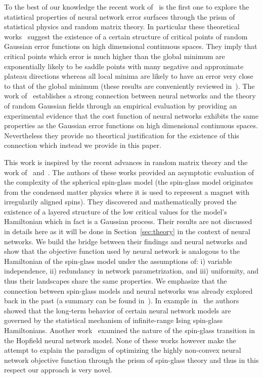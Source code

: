\documentclass[twoside]{article}
\begin{document}
To the best of our knowledge the recent work of~\cite{DBLP:journals/corr/DauphinPGCGB14} is the first one to explore the statistical properties of neural network error surfaces through the prism of statistical physics and random matrix theory. In particular these theoretical works~\cite{Bray2007,Fyodorov2007,Baldi:1989:NNP:70359.70362,wigner_semicircle} suggest the existence of a certain structure of critical points of random Gaussian error functions on high dimensional continuous spaces. They imply that critical points which error is much higher than the global minimum are exponentially likely to be saddle points with many negative and approximate plateau directions whereas all local minima are likely to have an error very close to that of the global minimum (these results are conveniently reviewed in~\cite{DBLP:journals/corr/DauphinPGCGB14}). The work of~\cite{DBLP:journals/corr/DauphinPGCGB14} establishes a strong connection between neural networks and the theory of random Gaussian fields through an empirical evaluation by providing an experimental evidence that the cost function of neural networks exhibits the same properties as the Gaussian error functions on high dimensional continuous spaces. Nevertheless they provide no theortical justification for the existence of this connection which instead we provide in this paper.

This work is inspired by the recent advances in random matrix theory and the work of~\cite{AAC2010} and~\cite{AAC2013}. The authors of these works provided an asymptotic evaluation of the complexity of the spherical spin-glass model (the spin-glass model originates from the condensed matter physics where it is used to represent a magnet with irregularily aligned spins). They discovered and mathematically proved the existence of a layered structure of the low critical values for the model's Hamiltonian which in fact is a Gaussian process. Their results are not discussed in details here as it will be done in Section~\ref{sec:theory} in the context of neural networks. We build the bridge between their findings and neural networks and show that the objective function used by neural network is analogous to the Hamiltonian of the spin-glass model under the assumptions of: i) variable independence, ii) redundancy in network parametrization, and iii) uniformity, and thus their landscapes share the same properties. We emphasize that the connection between spin-glass models and neural networks was already explored back in the past (a summary can be found in~\cite{Dotsenko1995}). In example in~\cite{PhysRevA.32.1007} the authors showed that the long-term behavior of certain neural network models are governed by the statistical mechanism of infinite-range Ising spin-glass Hamiltonians. Another work~\cite{0305-4470-30-23-009} examined the nature of the spin-glass transition in the Hopfield neural network model. None of these works however make the attempt to explain the paradigm of optimizing the highly non-convex neural network objective function through the prism of spin-glass theory and thus in this respect our approach is very novel.
\end{document}
